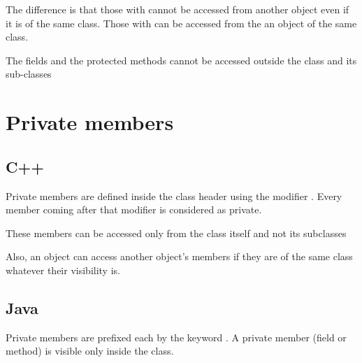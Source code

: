 \documentclass{KodeBook}
\begin{document}


The difference is that those with  cannot be accessed from another object even if it is of the same class. 
Those with  can be accessed from the an object of the same class.



The fields and the protected methods cannot be accessed outside the class and its sub-classes



\section{Private members}

\subsection{C++}

Private members are defined inside the class header using the modifier . 
Every member coming after that modifier is considered as private.



These members can be accessed only from the class itself and not its subclasses



Also, an object can access another object's members if they are of the same class whatever their visibility is.



\subsection{Java}

Private members are prefixed each by the keyword . 
A private member (field or method) is visible only inside the class. 
\end{document}
